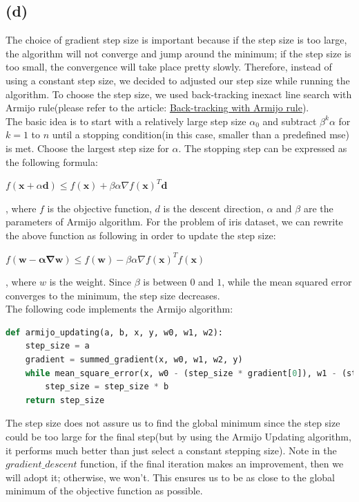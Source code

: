 \documentclass[12pt]{article}
\begin{document}
\subsection*{(d)}
The choice of gradient step size is important because if the step size is too large, the algorithm will not converge and jump around the minimum;
if the step size is too small, the convergence will take place pretty slowly. Therefore, instead of using a constant step size, we decided to adjusted
our step size while running the algorithm. To choose the step size, we used back-tracking inexact line search with
Armijo rule(please refer to the article: \href{http://www.cmap.polytechnique.fr/~dimo.brockhoff/introoptimization/exercises/09-descentalgorithms-exercise.pdf}{Back-tracking with Armijo rule}). \\
The basic idea is to start with a relatively large step size $\alpha_0$ and subtract $\beta^k\alpha$ for $k = 1$ to $n$ until a stopping condition(in this case, smaller than a predefined mse) is met. 
Choose the largest step size for $\alpha$. The stopping step can be expressed as the following formula: 
\begin{center}
    $f(\mathbf{x} + \alpha \mathbf{d}) \le f(\mathbf{x}) + \beta \alpha \nabla f(\mathbf{x})^{T}\mathbf{d}$
\end{center}
, where $f$ is the objective function, $d$ is the descent direction, $\alpha$ and $\beta$ are the parameters of Armijo algorithm. For the problem of iris dataset, we can rewrite the above function as following
in order to update the step size: 
\begin{center}
    $f(\mathbf{w - \alpha \nabla\mathbf{w}}) \le f(\mathbf{w})-\beta\alpha\nabla f(\mathbf{x})^{T}f(\mathbf{x})$
\end{center}
, where $w$ is the weight. Since $\beta$ is between $0$ and $1$, while the mean squared error converges to the minimum, the step size decreases. \\
The following code implements the Armijo algorithm: 
\begin{lstlisting}[language=Python, caption=Armijo Updating Step Size]
def armijo_updating(a, b, x, y, w0, w1, w2):
    step_size = a
    gradient = summed_gradient(x, w0, w1, w2, y)
    while mean_square_error(x, w0 - (step_size * gradient[0]), w1 - (step_size * gradient[1]), w2 - (step_size * gradient[2]), y) > mean_square_error(x, w0, w1, w2, y) - (0.5 * step_size * la.norm(gradient) ** 2):
        step_size = step_size * b
    return step_size
\end{lstlisting}
The step size does not assure us to find the global minimum since the step size could be too large for the final step(but by using the Armijo Updating algorithm,
it performs much better than just select a constant stepping size). Note in the $gradient\_descent$ function, if the final iteration makes an improvement, then we will adopt it; otherwise, we won't. This ensures us to be as close to the global minimum of the objective function
as possible. 
\end{document}
